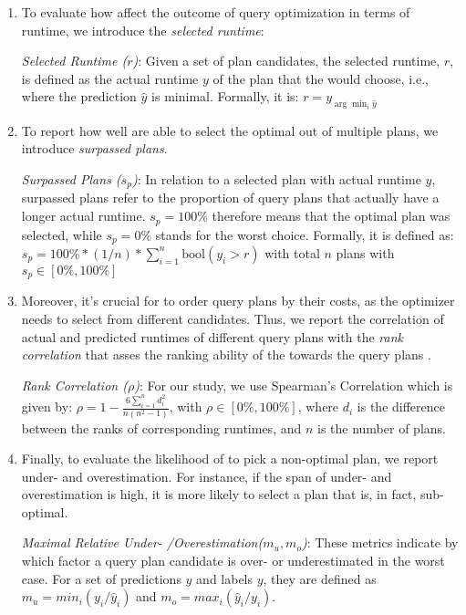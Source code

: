 \begin{enumerate}[leftmargin=*, nosep]
\item To evaluate how \lcms affect the outcome of query optimization in terms of runtime, we introduce the \textit{selected runtime}:
\begin{definition} \label{def:selected_runtime}
\textit{Selected Runtime ($r$)}:
Given a set of plan candidates, the selected runtime, $r$, is defined as the actual runtime $y$ of the plan that the \lcm would choose, i.e., where the prediction $\hat{y}$ is minimal.
Formally, it is:
$r = y_{\arg\min_{i} \hat{y}}$
\end{definition}

\item To report how well \lcms are able to select the optimal out of multiple plans, we introduce \textit{surpassed plans}.
\begin{definition}
\textit{Surpassed Plans ($s_p$)}:
In relation to a selected plan with actual runtime $y$, surpassed plans refer to the proportion of query plans that actually have a longer actual runtime.
$s_p=100\%$ therefore means that the optimal plan was selected, while $s_p=0\%$ stands for the worst choice.
Formally, it is defined as: $s_p = 100 \% * (1/n) * \sum_{i=1}^{n} \text{bool}(y_i > r)$ with total $n$ plans with $s_p \in [0\%, 100\%]$
\end{definition}
    
\item Moreover, it's crucial for \lcms to order query plans by their costs, as the optimizer needs to select from different candidates.
Thus, we report the correlation of actual and predicted runtimes of different query plans with the \textit{rank correlation} that asses the ranking ability of the \lcm towards the query plans \cite{spearman1904}.
\begin{definition}
\textit{Rank Correlation ($\rho$)}:
For our study, we use Spearman's Correlation which is given by: $\rho = 1 - \frac{6 \sum_{i=1}^{n} d_i^2}{n(n^2 - 1)}$, with $\rho \in [0\%, 100\%]$, where $d_i$ is the difference between the ranks of corresponding runtimes, and $n$ is the number of plans.
\end{definition}
    
\item Finally, to evaluate the likelihood of \lcms to pick a non-optimal plan, we report under- and overestimation.
For instance, if the span of \lcm  under- and overestimation is high, it is more likely to select a plan that is, in fact, sub-optimal.
\begin{definition} \textit{Maximal Relative Under- /Overestimation($m_u, m_o$)}:
These metrics indicate by which factor a query plan candidate is over- or underestimated in the worst case. 
For a set of predictions $\hat{y}$ and labels $y$, they are defined as $m_u = min_{i} (y_i / \hat{y}_i)$ and  $m_o = max_{i} (\hat{y}_i / y_i)$.
\end{definition}
\end{enumerate}

